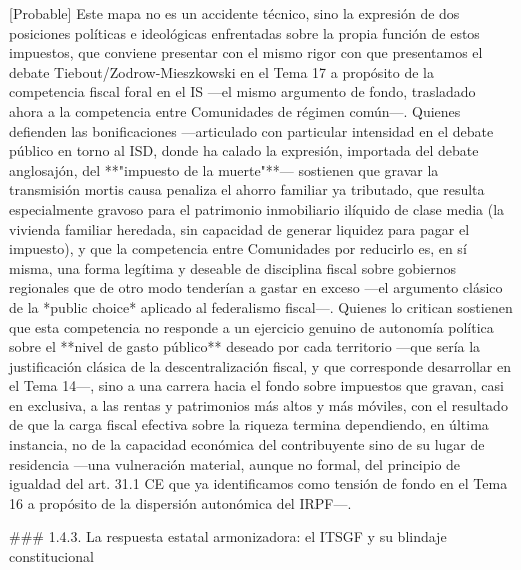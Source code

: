 \documentclass[10pt,a4paper]{article}
\begin{document}
[Probable] Este mapa no es un accidente técnico, sino la expresión de dos posiciones políticas e ideológicas enfrentadas sobre la propia función de estos impuestos, que conviene presentar con el mismo rigor con que presentamos el debate Tiebout/Zodrow-Mieszkowski en el Tema 17 a propósito de la competencia fiscal foral en el IS —el mismo argumento de fondo, trasladado ahora a la competencia entre Comunidades de régimen común—. Quienes defienden las bonificaciones —articulado con particular intensidad en el debate público en torno al ISD, donde ha calado la expresión, importada del debate anglosajón, del **"impuesto de la muerte"**— sostienen que gravar la transmisión mortis causa penaliza el ahorro familiar ya tributado, que resulta especialmente gravoso para el patrimonio inmobiliario ilíquido de clase media (la vivienda familiar heredada, sin capacidad de generar liquidez para pagar el impuesto), y que la competencia entre Comunidades por reducirlo es, en sí misma, una forma legítima y deseable de disciplina fiscal sobre gobiernos regionales que de otro modo tenderían a gastar en exceso —el argumento clásico de la *public choice* aplicado al federalismo fiscal—. Quienes lo critican sostienen que esta competencia no responde a un ejercicio genuino de autonomía política sobre el **nivel de gasto público** deseado por cada territorio —que sería la justificación clásica de la descentralización fiscal, y que corresponde desarrollar en el Tema 14—, sino a una carrera hacia el fondo sobre impuestos que gravan, casi en exclusiva, a las rentas y patrimonios más altos y más móviles, con el resultado de que la carga fiscal efectiva sobre la riqueza termina dependiendo, en última instancia, no de la capacidad económica del contribuyente sino de su lugar de residencia —una vulneración material, aunque no formal, del principio de igualdad del art. 31.1 CE que ya identificamos como tensión de fondo en el Tema 16 a propósito de la dispersión autonómica del IRPF—.

### 1.4.3. La respuesta estatal armonizadora: el ITSGF y su blindaje constitucional
\end{document}
